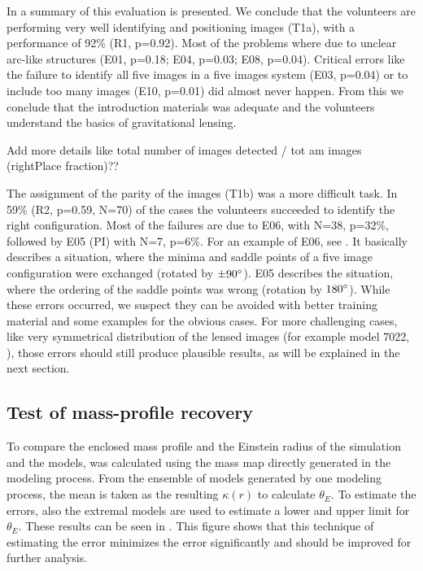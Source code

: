 In  a summary of this evaluation is presented.
We conclude that the volunteers are performing very well identifying and positioning images (T1a), with a performance of 92\% (R1, p=0.92).
Most of the problems where due to unclear arc-like structures (E01, p=0.18; E04, p=0.03; E08, p=0.04).
Critical errors like the failure to identify all five images in a five images system (E03, p=0.04) or to include too many images (E10, p=0.01) did almost never happen.
From this we conclude that the introduction materials was adequate and the volunteers understand the basics of gravitational lensing.

 Add more details like total number of images detected / tot am images (rightPlace fraction)??

The assignment of the parity of the images (T1b) was a more difficult task.
In 59\% (R2, p=0.59, N=70) of the cases the volunteers succeeded to identify the right configuration.
Most of the failures are due to E06, with N=38, p=32\%, followed by E05 (PI) with N=7, p=6\%.
For an example of E06, see .
It basically describes a situation, where the minima and saddle points of a five image configuration were exchanged (rotated by $\pm90^{\circ}$).
E05 describes the situation, where the ordering of the saddle points was wrong (rotation by $180^{\circ}$).
While these errors occurred, we suspect they can be avoided with better training material and some examples for the obvious cases.
For more challenging cases, like very symmetrical distribution of the lensed images (for example model 7022, ), those errors should still produce plausible results, as will be explained in the next section.



\subsection{Test of mass-profile recovery} \label{sec:tests.t2}

To compare the enclosed mass profile and the Einstein radius of the simulation and the models, \kenc was calculated using the mass map \kap[x,y] directly generated in the modeling process.
From the ensemble of models generated by one modeling process, the mean is taken as the resulting $\kappa(r)$ to calculate $\theta_E$.
To estimate the errors, also the extremal models are used to estimate a lower and upper limit for $\theta_E$.
These results can be seen in .
This figure shows that this technique of estimating the error minimizes the error significantly and should be improved for further analysis.


